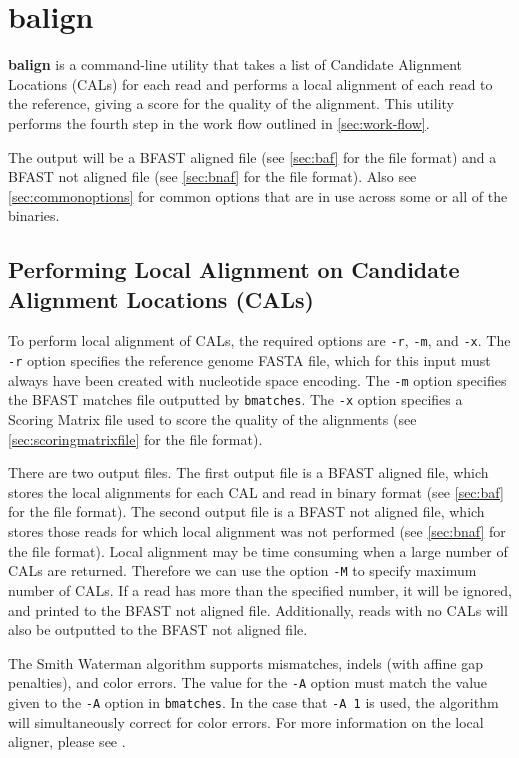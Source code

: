 \documentclass[a4paper,12pt]{book}
\newcommand{\TT}[1]{{\tt #1}} %
\newcommand{\BF}[1]{{\bf #1}} %
\newcommand{\rGFF}{reference genome FASTA file}
\newcommand{\BMF}{BFAST matches file} %
\newcommand{\BAF}{BFAST aligned file} %
\newcommand{\BNAF}{BFAST not aligned file} %
\begin{document}
\section{balign}
\label{sec:balign}
\BF{balign} is a command-line utility that takes a list of Candidate Alignment Locations (CALs) for each read and performs a local alignment of each read to the reference, giving a score for the quality of the alignment.
This utility performs the fourth step in the work flow outlined in \autoref{sec:work-flow}.

The output will be a \BAF{} (see \autoref{sec:baf} for the file format) and a \BNAF{} (see \autoref{sec:bnaf} for the file format).
Also see \autoref{sec:commonoptions} for common options that are in use across some or all of the binaries.

\subsection{Performing Local Alignment on Candidate Alignment Locations (CALs)}
\label{sec:local-alignment}
To perform local alignment of CALs, the required options are \TT{-r}, \TT{-m}, and \TT{-x}.
The \TT{-r} option specifies the \rGFF{}, which for this input must always have been created with nucleotide space encoding.
The \TT{-m} option specifies the \BMF{} outputted by \TT{bmatches}.
The \TT{-x} option specifies a Scoring Matrix file used to score the quality of the alignments (see \autoref{sec:scoringmatrixfile} for the file format).

There are two output files.
The first output file is a \BAF{}, which stores the local alignments for each CAL and read in binary format (see \autoref{sec:baf} for the file format).
The second output file is a \BNAF{}, which stores those reads for which local alignment was not performed (see \autoref{sec:bnaf} for the file format).
Local alignment may be time consuming when a large number of CALs are returned.
Therefore we can use the option \TT{-M} to specify maximum number of CALs.
If a read has more than the specified number, it will be ignored, and printed to the \BNAF{}.
Additionally, reads with no CALs will also be outputted to the \BNAF{}. 

The Smith Waterman algorithm supports mismatches, indels (with affine gap penalties), and color errors.
The value for the \TT{-A} option must match the value given to the \TT{-A} option in \TT{bmatches}.
In the case that \TT{-A 1} is used, the algorithm will simultaneously correct for color errors.
For more information on the local aligner, please see \cite{BFAST-local-alignment}.
\end{document}
